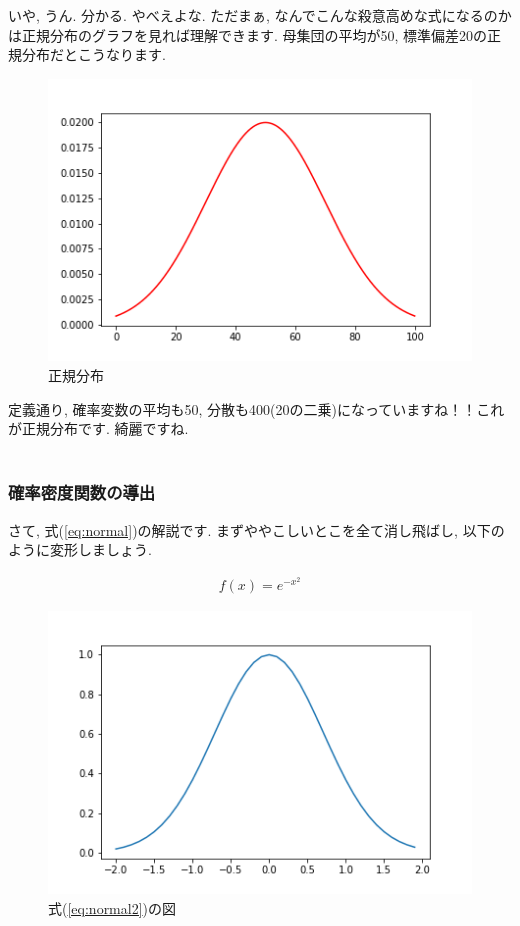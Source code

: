 \documentclass[11pt,a4paper]{jreport}
\begin{document}
いや, うん. 分かる. やべえよな. ただまぁ, なんでこんな殺意高めな式になるのかは正規分布のグラフを見れば理解できます. 母集団の平均が50, 標準偏差20の正規分布だとこうなります.

\begin{figure}[H]
\label{im:normal}
  \centering
  \includegraphics[width=120mm,bb=0 0 432 288]{figures/normal.png}
  \caption{正規分布}
\end{figure}

定義通り, 確率変数の平均も50, 分散も400(20の二乗)になっていますね！！これが正規分布です. 綺麗ですね.\\
\\
\subsubsection{確率密度関数の導出}
さて, 式(\ref{eq:normal})の解説です. まずややこしいとこを全て消し飛ばし, 以下のように変形しましょう. 

\begin{eqnarray}
\label{eq:normal2}
f(x) = e^{-x^2}
\end{eqnarray}

\begin{figure}[H]
\label{im:normal}
  \centering
  \includegraphics[width=120mm,bb=0 0 432 288]{figures/normal2.png}
  \caption{式(\ref{eq:normal2})の図}
\end{figure}
\end{document}
